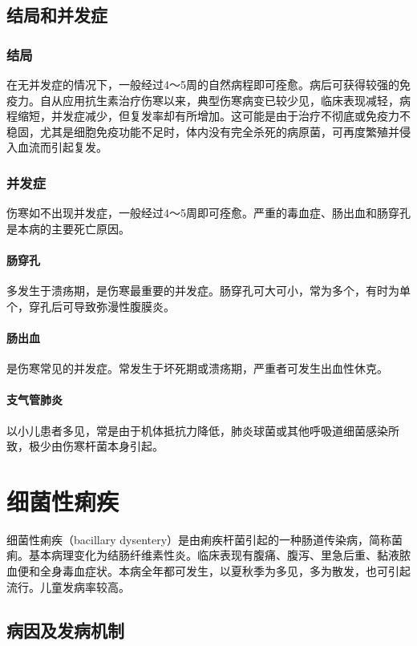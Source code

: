\subsection{结局和并发症}

\subsubsection{结局}

在无并发症的情况下，一般经过4～5周的自然病程即可痊愈。病后可获得较强的免疫力。自从应用抗生素治疗伤寒以来，典型伤寒病变已较少见，临床表现减轻，病程缩短，并发症减少，但复发率却有所增加。这可能是由于治疗不彻底或免疫力不稳固，尤其是细胞免疫功能不足时，体内没有完全杀死的病原菌，可再度繁殖并侵入血流而引起复发。

\subsubsection{并发症}

伤寒如不出现并发症，一般经过4～5周即可痊愈。严重的毒血症、肠出血和肠穿孔是本病的主要死亡原因。

\paragraph{肠穿孔}
多发生于溃疡期，是伤寒最重要的并发症。肠穿孔可大可小，常为多个，有时为单个，穿孔后可导致弥漫性腹膜炎。

\paragraph{肠出血}
是伤寒常见的并发症。常发生于坏死期或溃疡期，严重者可发生出血性休克。

\paragraph{支气管肺炎}
以小儿患者多见，常是由于机体抵抗力降低，肺炎球菌或其他呼吸道细菌感染所致，极少由伤寒杆菌本身引起。

\section{细菌性痢疾}

细菌性痢疾（bacillary
dysentery）是由痢疾杆菌引起的一种肠道传染病，简称菌痢。基本病理变化为结肠纤维素性炎。临床表现有腹痛、腹泻、里急后重、黏液脓血便和全身毒血症状。本病全年都可发生，以夏秋季为多见，多为散发，也可引起流行。儿童发病率较高。

\subsection{病因及发病机制}

